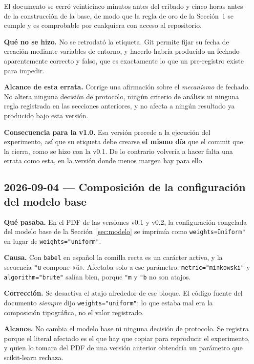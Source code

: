 \documentclass[11pt,letterpaper]{article}
\begin{document}
El documento se cerró veinticinco minutos antes del cribado y cinco horas antes de
la construcción de la base, de modo que la regla de oro de la Sección~1 se cumple y
es comprobable por cualquiera con acceso al repositorio.

\textbf{Qué no se hizo.} No se retrodató la etiqueta. Git permite fijar su fecha de
creación mediante variables de entorno, y hacerlo habría producido un fechado
aparentemente correcto y falso, que es exactamente lo que un pre-registro existe
para impedir.

\textbf{Alcance de esta errata.} Corrige una afirmación sobre el \emph{mecanismo}
de fechado. No altera ninguna decisión de protocolo, ningún criterio de análisis ni
ninguna regla registrada en las secciones anteriores, y no afecta a ningún
resultado ya producido bajo esta versión.

\textbf{Consecuencia para la v1.0.} Esa versión precede a la ejecución del
experimento, así que su etiqueta debe crearse \textbf{el mismo día} que el commit
que la cierra, como se hizo con la v0.1. De lo contrario volvería a hacer falta una
errata como esta, en la versión donde menos margen hay para ello.

\subsection*{2026-09-04 --- Composición de la configuración del modelo base}

\textbf{Qué pasaba.} En el PDF de las versiones v0.1 y v0.2, la configuración
congelada del modelo base de la Sección~\ref{sec:modelo} se imprimía como
\texttt{weights=üniform"} en lugar de \texttt{weights="uniform"}.

\textbf{Causa.} Con \texttt{babel} en español la comilla recta es un carácter
activo, y la secuencia \texttt{"u} compone «ü». Afectaba solo a ese parámetro:
\texttt{metric="minkowski"} y \texttt{algorithm="brute"} salían bien, porque
\texttt{"m} y \texttt{"b} no son atajos.

\textbf{Corrección.} Se desactiva el atajo alrededor de ese bloque. El código
fuente del documento \emph{siempre} dijo \texttt{weights="uniform"}: lo que estaba
mal era la composición tipográfica, no el valor registrado.

\textbf{Alcance.} No cambia el modelo base ni ninguna decisión de protocolo. Se
registra porque el literal afectado es el que hay que copiar para reproducir el
experimento, y quien lo tomara del PDF de una versión anterior obtendría un
parámetro que scikit-learn rechaza.
\end{document}
